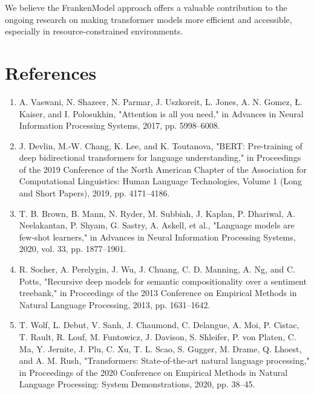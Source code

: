 \documentclass{article}
\begin{document}
We believe the FrankenModel approach offers a valuable contribution to the ongoing research on making transformer models more efficient and accessible, especially in resource-constrained environments.

\section*{References}
\begin{enumerate}
    \item A. Vaswani, N. Shazeer, N. Parmar, J. Uszkoreit, L. Jones, A. N. Gomez, Ł. Kaiser, and I. Polosukhin, "Attention is all you need," in Advances in Neural Information Processing Systems, 2017, pp. 5998–6008.
    
    \item J. Devlin, M.-W. Chang, K. Lee, and K. Toutanova, "BERT: Pre-training of deep bidirectional transformers for language understanding," in Proceedings of the 2019 Conference of the North American Chapter of the Association for Computational Linguistics: Human Language Technologies, Volume 1 (Long and Short Papers), 2019, pp. 4171–4186.
    
    \item T. B. Brown, B. Mann, N. Ryder, M. Subbiah, J. Kaplan, P. Dhariwal, A. Neelakantan, P. Shyam, G. Sastry, A. Askell, et al., "Language models are few-shot learners," in Advances in Neural Information Processing Systems, 2020, vol. 33, pp. 1877–1901.
    
    \item R. Socher, A. Perelygin, J. Wu, J. Chuang, C. D. Manning, A. Ng, and C. Potts, "Recursive deep models for semantic compositionality over a sentiment treebank," in Proceedings of the 2013 Conference on Empirical Methods in Natural Language Processing, 2013, pp. 1631–1642.
    
    \item T. Wolf, L. Debut, V. Sanh, J. Chaumond, C. Delangue, A. Moi, P. Cistac, T. Rault, R. Louf, M. Funtowicz, J. Davison, S. Shleifer, P. von Platen, C. Ma, Y. Jernite, J. Plu, C. Xu, T. L. Scao, S. Gugger, M. Drame, Q. Lhoest, and A. M. Rush, "Transformers: State-of-the-art natural language processing," in Proceedings of the 2020 Conference on Empirical Methods in Natural Language Processing: System Demonstrations, 2020, pp. 38–45.
\end{enumerate}
\end{document}

